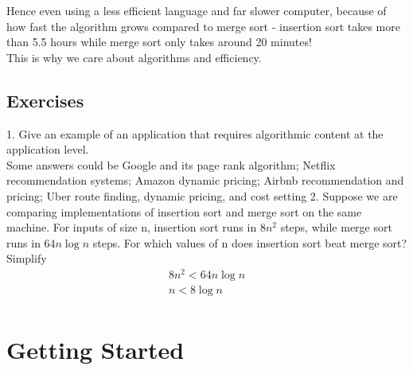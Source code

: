 \documentclass{scrartcl}
\theoremstyle{definition}
\theoremstyle{definition}
\theoremstyle{remark}
\numberwithin{equation}{section}
\begin{document}
Hence even using a less efficient language and far slower computer, because of how fast the algorithm grows compared to merge sort - insertion sort takes more than 5.5 hours while merge sort only takes around 20 minutes!\\
This is why we care about algorithms and efficiency.
\subsection{Exercises}
\begin{itemize}
1. Give an example of an application that requires algorithmic content at the application level.\\
Some answers could be Google and its page rank algorithm; Netflix recommendation systems; Amazon dynamic pricing; Airbnb recommendation and pricing; Uber route finding, dynamic pricing, and cost setting
2. Suppose we are comparing implementations of insertion sort and merge sort on the same machine. For inputs of size n, insertion sort runs in $8n^2$ steps, while merge sort runs in $64n\log n$ steps. For which values of n does insertion sort beat merge sort?\\
Simplify 
\begin{align}
8n^2<64n\log n\\
    n<8\log n\\
\end{align}
\end{itemize}

\section{Getting Started}
\end{document}
